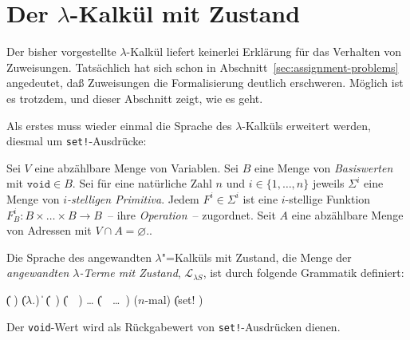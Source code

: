 \section{Der $\lambda$-Kalkül mit Zustand}

Der bisher vorgestellte $\lambda$-Kalkül liefert keinerlei Erklärung
für das Verhalten von Zuweisungen.  Tatsächlich hat sich schon in
Abschnitt~\ref{sec:assignment-problems} angedeutet, daß Zuweisungen
die Formalisierung deutlich erschweren.  Möglich ist es trotzdem, und
dieser Abschnitt zeigt, wie es geht.

Als erstes muss wieder einmal die Sprache des $\lambda$-Kalküls
erweitert werden, diesmal um \texttt{set!}-Ausdrücke:
%
\begin{definition}
  Sei $V$ eine abzählbare Menge von Variablen.  Sei $B$ eine Menge von
  \textit{Basiswerten} mit $\mathtt{void} \in B$.
  Sei für eine natürliche Zahl $n$ und $i \in \{1, \ldots, n\}$
  jeweils $\Sigma^i$ eine Menge von \textit{$i$-stelligen
    Primitiva}.  Jedem $F^i\in\Sigma^i$ ist eine
  $i$-stellige Funktion $F_B^i: B\times\ldots\times B \rightarrow
  B$~-- ihre \textit{Operation}~-- zugordnet.
  Seit $A$ eine abzählbare Menge von Adressen mit $V\cap A =
  \varnothing$.. 

  Die Sprache des angewandten $\lambda$"=Kalküls mit Zustand, die
  Menge der \textit{angewandten $\lambda$-Terme mit Zustand},
  $\mathcal{L}_{\lambda{}S}$, ist
  durch folgende Grammatik definiert:
  \begin{grammar}
     \: 
    \> \| ( )
    \> \| ($\lambda$.)
    \> \| 
    \> \| (~)
    \> \| (~~)
    \> \ldots
    \> \| (~~\ldots~)  \quad \textrm{($n$-mal)}
    \> \| (set!  )
  \end{grammar}
\end{definition}
%
Der \texttt{void}-Wert wird als Rückgabewert von
\texttt{set!}-Ausdrücken dienen.

